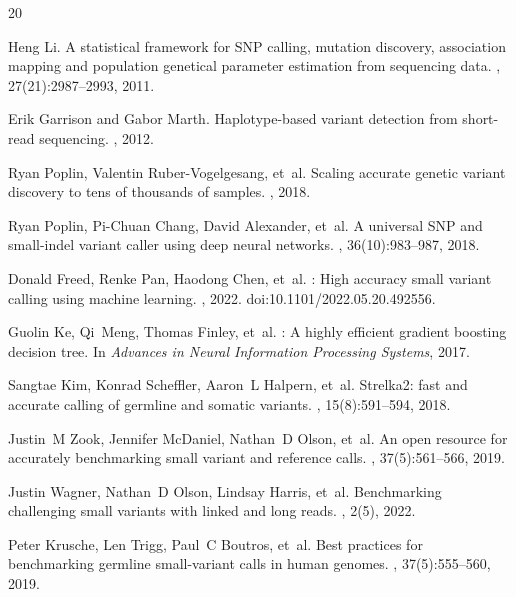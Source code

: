 \documentclass[sigconf]{acmart}
\begin{document}

\begin{thebibliography}{20}

Heng Li.
\newblock A statistical framework for {SNP} calling, mutation discovery, association mapping and population genetical parameter estimation from sequencing data.
, 27(21):2987--2993, 2011.

Erik Garrison and Gabor Marth.
\newblock Haplotype-based variant detection from short-read sequencing.
, 2012.

Ryan Poplin, Valentin Ruber-Vogelgesang, et~al.
\newblock Scaling accurate genetic variant discovery to tens of thousands of samples.
, 2018.

Ryan Poplin, Pi-Chuan Chang, David Alexander, et~al.
\newblock A universal {SNP} and small-indel variant caller using deep neural networks.
, 36(10):983--987, 2018.

Donald Freed, Renke Pan, Haodong Chen, et~al.
: High accuracy small variant calling using machine learning.
, 2022.
\newblock doi:10.1101/2022.05.20.492556.

Guolin Ke, Qi~Meng, Thomas Finley, et~al.
: A highly efficient gradient boosting decision tree.
\newblock In {\em Advances in Neural Information Processing Systems}, 2017.

Sangtae Kim, Konrad Scheffler, Aaron~L Halpern, et~al.
\newblock Strelka2: fast and accurate calling of germline and somatic variants.
, 15(8):591--594, 2018.

Justin~M Zook, Jennifer McDaniel, Nathan~D Olson, et~al.
\newblock An open resource for accurately benchmarking small variant and reference calls.
, 37(5):561--566, 2019.

Justin Wagner, Nathan~D Olson, Lindsay Harris, et~al.
\newblock Benchmarking challenging small variants with linked and long reads.
, 2(5), 2022.

Peter Krusche, Len Trigg, Paul~C Boutros, et~al.
\newblock Best practices for benchmarking germline small-variant calls in human genomes.
, 37(5):555--560, 2019.


\end{thebibliography}
\end{document}
